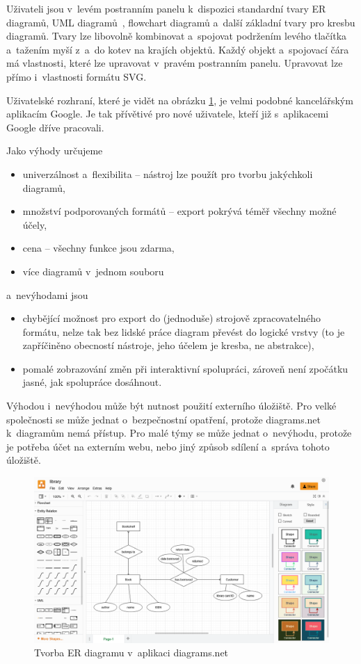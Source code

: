 Uživateli jsou v~levém postranním panelu k~dispozici standardní tvary ER
diagramů, UML diagramů~\cite{uml2017}, flowchart diagramů a~další základní tvary
pro kresbu diagramů. Tvary lze libovolně kombinovat a~spojovat podržením levého
tlačítka a~tažením myší z~a~do kotev na krajích objektů. Každý objekt
a~spojovací čára má vlastnosti, které lze upravovat v~pravém postranním panelu.
Upravovat lze přímo i~vlastnosti formátu SVG.

Uživatelské rozhraní, které je vidět na obrázku \ref{fig:diagrams.net}, je velmi
podobné kancelářským aplikacím Google. Je tak přívětivé pro nové uživatele,
kteří již s~aplikacemi Google dříve pracovali.

Jako výhody určujeme
\begin{itemize}
  \item univerzálnost a~flexibilita -- nástroj lze použít pro tvorbu jakýchkoli
  diagramů,
  \item množství podporovaných formátů -- export pokrývá téměř všechny možné
  účely,
  \item cena -- všechny funkce jsou zdarma,
  \item více diagramů v~jednom souboru
\end{itemize}
a~nevýhodami jsou
\begin{itemize}
  \item chybějící možnost pro export do (jednoduše) strojově zpracovatelného
  formátu, nelze tak bez lidské práce diagram převést do logické vrstvy (to je
  zapříčiněno obecností nástroje, jeho účelem je kresba, ne abstrakce),
  \item pomalé zobrazování změn při interaktivní spolupráci, zároveň není
  zpočátku jasné, jak spolupráce dosáhnout.
\end{itemize}

Výhodou i~nevýhodou může být nutnost použití externího úložiště. Pro velké
společnosti se může jednat o~bezpečnostní opatření, protože diagrams.net
k~diagramům nemá přístup. Pro malé týmy se může jednat o~nevýhodu, protože je
potřeba účet na externím webu, nebo jiný způsob sdílení a~správa tohoto
úložiště.

\begin{figure}
  \centering
  \includegraphics[width=\textwidth]{../img/diagrams.net.png}
  \caption{Tvorba ER diagramu v~aplikaci diagrams.net}
  \label{fig:diagrams.net}
\end{figure}

